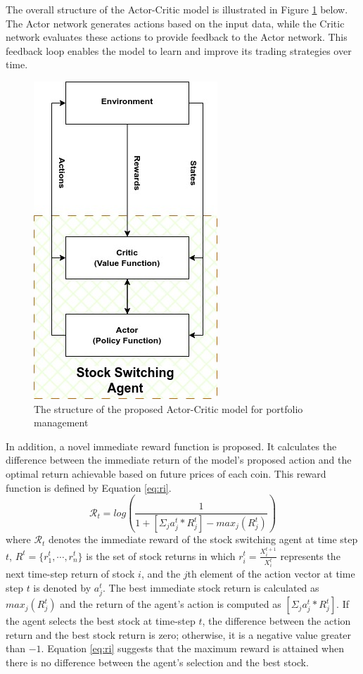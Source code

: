 The overall structure of the Actor-Critic model is illustrated in Figure \ref{fig:actor-critic} below. The Actor network generates actions based on the input data, while the Critic network evaluates these actions to provide feedback to the Actor network. This feedback loop enables the model to learn and improve its trading strategies over time.


\begin{figure}[H]
	\centering
	\includegraphics[scale=0.4]{./Actor-critic-arch.jpg}
	\caption{The structure of the proposed Actor-Critic model for portfolio management}
	\label{fig:actor-critic}
\end{figure}

In addition, a novel immediate reward function is proposed. It calculates the difference between the immediate return of the model's proposed action and the optimal return achievable based on future prices of each coin. This reward function is defined by Equation \eqref{eq:ri}.
\begin{equation}
	\mathcal{R}_t = log(\frac{1}{1 + [\Sigma_{j} a_j^t * R_j^t] - max_j(R_j^t)})
	\label{eq:ri}
\end{equation}
where $\mathcal{R}_t$ denotes the immediate reward of the stock switching agent at time step $t$, $R^t = \{r_1^t, \cdots, r_n^t\}$ is the set of stock returns in which $r_i^t = \frac{X_i^{t+1}}{X_i^t}$ represents the next time-step return of stock $i$, and the $j$th element of the action vector at time step $t$ is denoted by $a_j^t$. The best immediate stock return is calculated as $max_j(R_j^t)$ and the return of the agent's action is computed as $ [\Sigma_{j} a_j^t * R_j^t]$. If the agent selects the best stock at time-step $t$, the difference between the action return and the best stock return is zero; otherwise, it is a negative value greater than $-1$. Equation \eqref{eq:ri} suggests that the maximum reward is attained when there is no difference between the agent's selection and the best stock.